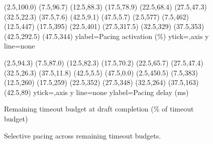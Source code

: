 \begin{figure}[t]
\begin{minipage}[t]{0.48\linewidth}
    \centering
      {(2.5,100.0) (7.5,96.7) (12.5,88.3) (17.5,78.9) (22.5,68.4)
       (27.5,47.3) (32.5,22.3) (37.5,7.6) (42.5,9.1) (47.5,5.7)}
      {(2.5,577) (7.5,462) (12.5,447) (17.5,395) (22.5,401)
       (27.5,317.5) (32.5,329) (37.5,353) (42.5,292.5) (47.5,344)}
      {ylabel={Pacing activation (\%)}}
      {ytick=\empty,axis y line=none}
      {}
  \end{minipage}\hfill
  \begin{minipage}[t]{0.48\linewidth}
    \centering
      {(2.5,94.3) (7.5,87.0) (12.5,82.3) (17.5,70.2) (22.5,65.7)
       (27.5,47.4) (32.5,26.3) (37.5,11.8) (42.5,5.5) (47.5,0.0)}
      {(2.5,450.5) (7.5,383) (12.5,260) (17.5,259) (22.5,352)
       (27.5,348) (32.5,264) (37.5,163) (42.5,89)}
      {ytick=\empty,axis y line=none}
      {ylabel={Pacing delay (ms)}}
      {}
  \end{minipage}
  \par\vspace{3pt}
  {\fontsize{6}{7}\selectfont
    Remaining timeout budget at draft completion (\% of timeout budget)\par}
  \vspace{3pt}
  {\rqfourlegend\par}
  \caption{Selective pacing across remaining timeout budgets.}
  \label{fig:rq4_slack_activation}
\end{figure}
